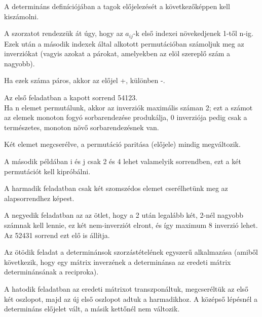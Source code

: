 \begin{frame}
  \begin{tcolorbox}[title={Megoldások {\symking}}]
    A determináns definíciójában a tagok előjelezését a következőképpen kell kiszámolni.\\
    \mmedskip
    
    A szorzatot rendezzük át úgy, hogy az $a_{ij}$-k első indexei növekedjenek 1-től n-ig.\\
    Ezek után a második indexek által alkotott permutációban számoljuk meg az inverziókat (vagyis azokat a párokat, amelyekben az elöl szereplő szám a nagyobb).\\
    \mmedskip
    
    Ha ezek száma páros, akkor az előjel +, különben -.\\
    \mmedskip
    
    Az első feladatban a kapott sorrend 54123.\\
    Ha n elemet permutálunk, akkor az inverziók maximális száman 2; ezt a számot az elemek monoton fogyó sorbarendezése produkálja, 0 inverziója pedig csak a természetes, monoton növő sorbarendezésnek van.\\
    \mmedskip
    
    Két elemet megcserélve, a permutáció paritása (előjele) mindig megváltozik.\\
    \mmedskip
    
    A második példában i és j csak 2 és 4 lehet valamelyik sorrendben, ezt a két permutációt kell kipróbálni.\\
    \mmedskip
    
    A harmadik feladatban csak két szomszédos elemet cserélhetünk meg az alapsorrendhez képest.\\
    \mmedskip
    
    A negyedik feladatban az az ötlet, hogy a 2 után legalább két, 2-nél nagyobb számnak kell lennie, ez két nem-inverziót elront, és így maximum 8 inverzió lehet. Az 52431 sorrend ezt elő is állítja.\\
    \mmedskip
    
    Az ötödik feladat a determinánsok szorzástételének egyszerű alkalmazása (amiből következik, hogy egy mátrix inverzének a determinánsa az eredeti mátrix determinánsának a reciproka).\\
    \mmedskip
    
    A hatodik feladatban az eredeti mátrixot transzponáltuk, megcseréltük az első két oszlopot, majd az új első oszlopot adtuk a harmadikhoz. A középső lépésnél a determináns előjelet vált, a másik kettőnél nem változik.
  \end{tcolorbox}
\end{frame}


